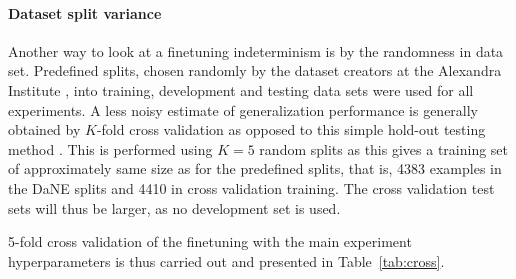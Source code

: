\documentclass[main.tex]{subfiles}
\begin{document}
\paragraph{Dataset split variance}
Another way to look at a finetuning indeterminism is by the randomness in data set.
Predefined splits, chosen randomly by the dataset creators at the Alexandra Institute \cite{hvingelby2020dane}, into training, development and testing data sets were used for all experiments.
A less noisy estimate of generalization performance is generally obtained by $K$-fold cross validation as opposed to this simple hold-out testing method \cite[Sec. 1.3]{bishop2006pattern}.
This is performed using $K=5$ random splits as this gives a training set of approximately same size as for the predefined splits, that is, 4383 examples in the DaNE splits and 4410 in cross validation training.
The cross validation test sets will thus be larger, as no development set is used.

5-fold cross validation of the finetuning with the main experiment hyperparameters is thus carried out and presented in Table~\ref{tab:cross}.









\end{document}
